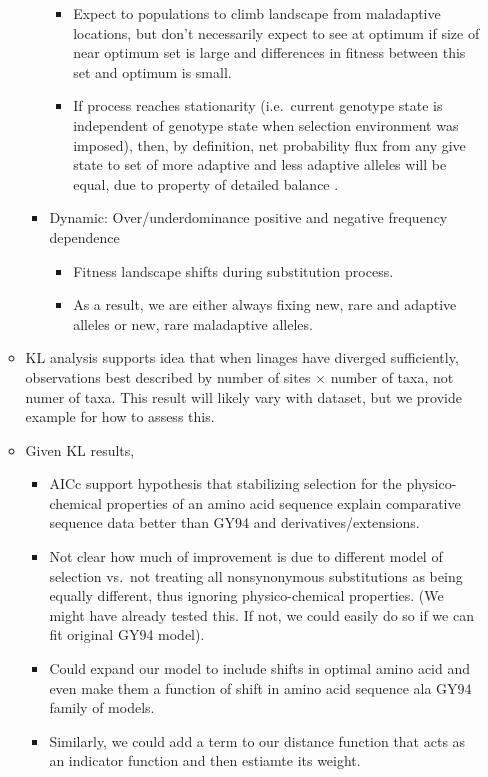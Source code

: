\documentclass[12pt,letterpaper]{article}
\newcommand{\PC}{physico-chemical\xspace}
\begin{document}
\begin{itemize}
\begin{itemize}
\begin{itemize}
      \begin{itemize}
      \item Expect to populations to climb landscape from maladaptive locations, but don't necessarily expect to see at optimum if size of near optimum set is large and differences in fitness between this set and optimum is small.
      \item If process reaches stationarity (i.e.~current genotype state is independent of genotype state when selection environment was imposed), then, by definition, net probability flux from any give state to set of more adaptive and less adaptive alleles will be equal, due to property of detailed balance \citep{Iwasa1988,SellaAndHirsh2005}.
      \end{itemize}
    \item Dynamic: Over/underdominance positive and negative frequency dependence
      \begin{itemize}
      \item Fitness landscape shifts during substitution process.
      \item As a result, we are either always fixing new, rare and adaptive alleles or new, rare maladaptive alleles.
      \end{itemize}
    \end{itemize}
  \item KL analysis supports idea that when linages have diverged sufficiently, observations best described by number of sites $\times$ number of taxa, not numer of taxa.
    This result will likely vary with dataset, but we provide example for how to assess this.
  \item  Given KL results,
    \begin{itemize}
    \item AICc support hypothesis that stabilizing selection for the \PC properties of an amino acid sequence explain comparative sequence data better than GY94 and derivatives/extensions.
    \item Not clear how much of improvement is due to different model of selection vs.~not treating all nonsynonymous substitutions as being equally different, thus ignoring \PC properties.
      (We might have already tested this.  If not, we could easily do so if we can fit original GY94 model).
  \item Could expand our model to include shifts in optimal amino acid and even make them a function of shift in amino acid sequence ala GY94 family of models.
  \item Similarly, we could add a term to our distance function that acts as an indicator function and then estiamte its weight.

\end{itemize}
\end{itemize}
\end{itemize}
\end{document}
